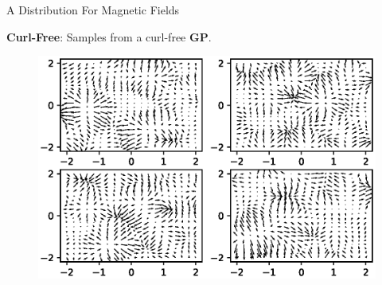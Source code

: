 \documentclass{beamer}
\begin{document}
\begin{frame}{A Distribution For Magnetic Fields}

  \textbf{Curl-Free}: Samples from a curl-free \textbf{GP}.

  \begin{figure}
    \includegraphics[width=\linewidth]{plots/curl_free.eps}
  \end{figure}

\end{frame}
\end{document}
